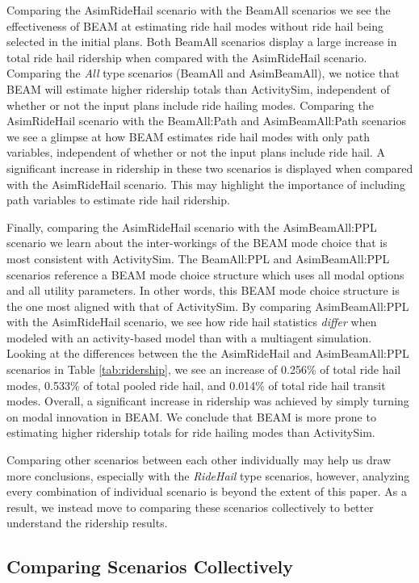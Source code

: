 \documentclass[fancy, masters]{byuthesis}
\begin{document}
Comparing the AsimRideHail scenario with the BeamAll scenarios we see the effectiveness of BEAM at estimating ride hail modes without ride hail being selected in the initial plans. Both BeamAll scenarios display a large increase in total ride hail ridership when compared with the AsimRideHail scenario. Comparing the \emph{All} type scenarios (BeamAll and AsimBeamAll), we notice that BEAM will estimate higher ridership totals than ActivitySim, independent of whether or not the input plans include ride hailing modes. Comparing the AsimRideHail scenario with the BeamAll:Path and AsimBeamAll:Path scenarios we see a glimpse at how BEAM estimates ride hail modes with only path variables, independent of whether or not the input plans include ride hail. A significant increase in ridership in these two scenarios is displayed when compared with the AsimRideHail scenario. This may highlight the importance of including path variables to estimate ride hail ridership.

Finally, comparing the AsimRideHail scenario with the AsimBeamAll:PPL scenario we learn about the inter-workings of the BEAM mode choice that is most consistent with ActivitySim. The BeamAll:PPL and AsimBeamAll:PPL scenarios reference a BEAM mode choice structure which uses all modal options and all utility parameters. In other words, this BEAM mode choice structure is the one most aligned with that of ActivitySim. By comparing AsimBeamAll:PPL with the AsimRideHail scenario, we see how ride hail statistics \emph{differ} when modeled with an activity-based model than with a multiagent simulation. Looking at the differences between the the AsimRideHail and AsimBeamAll:PPL scenarios in Table \ref{tab:ridership}, we see an increase of 0.256\% of total ride hail modes, 0.533\% of total pooled ride hail, and 0.014\% of total ride hail transit modes. Overall, a significant increase in ridership was achieved by simply turning on modal innovation in BEAM. We conclude that BEAM is more prone to estimating higher ridership totals for ride hailing modes than ActivitySim.

Comparing other scenarios between each other individually may help us draw more conclusions, especially with the \emph{RideHail} type scenarios, however, analyzing every combination of individual scenario is beyond the extent of this paper. As a result, we instead move to comparing these scenarios collectively to better understand the ridership results.

\hypertarget{res-col}{%
\subsection{Comparing Scenarios Collectively}\label{res-col}}
\end{document}
